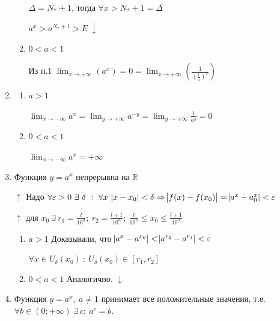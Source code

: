 \documentclass{article}
\begin{document}
\begin{enumerate}
\begin{enumerate}
            \(\Delta = N_* + 1\), тогда \(\forall x > N_* + 1 = \Delta\)

            \(a^x > a^{N_*+1} > E\ \downarrow\)
                        
            \item \(0 < a < 1\)

            Из п.1 \( \lim_{x \to +\infty}(a^x) = 0 = \lim_{x \to +\infty}(\frac{1}{(\frac{1}{a})^x}) \)
        \end{enumerate}

        \item
        \begin{enumerate}
            \item \( a > 1 \)
            
            \( \lim_{x \to -\infty} a^x = \lim_{y \to +\infty} a^{-y} = \lim_{y \to +\infty} \frac{1}{a^y} = 0 \)
            
            \item \( 0 < a < 1 \) 
            
            \( \lim_{x \to -\infty} a^x = +\infty \)
        \end{enumerate}
        
        \item Функция \(y = a^x\) непрерывна на \(\mathbb{R}\)

        \(\uparrow\) Надо \(\forall \varepsilon > 0\ \exists\ \delta\ :\ \forall x\ \abs{x - x_0} < \delta \Rightarrow \abs{f(x) - f(x_0)} = \abs{a^x-a^x_0} < \varepsilon\)

        \(\uparrow\) для \(x_0\ \exists\ r_1 = \frac{l}{10^n};\ r_2 = \frac{l + 1}{10^n};\ \frac{l}{10^n} \leq x_0 \leq \frac{l + 1}{10^n} \)
        
        \begin{enumerate}
            \item \( a > 1 \) Доказывали, что \( \abs{a^x - a^{x_0}} < \abs{a^{r_2} - a^{r_1}} < \varepsilon \)
        
            \(\forall x \in U_{\delta}(x_0)\ :\ U_{\delta}(x_0) \in [r_1, r_2]\)

            \item \( 0 < a < 1 \) Аналогично. \(\downarrow\)
        \end{enumerate}
        
        \item Функция \(y = a^x,\ a \neq 1\) принимает все положительные значения, т.е. \(\forall b \in (0; +\infty)\ \exists\ c:\ a^c = b\).


\end{enumerate}
\end{document}
